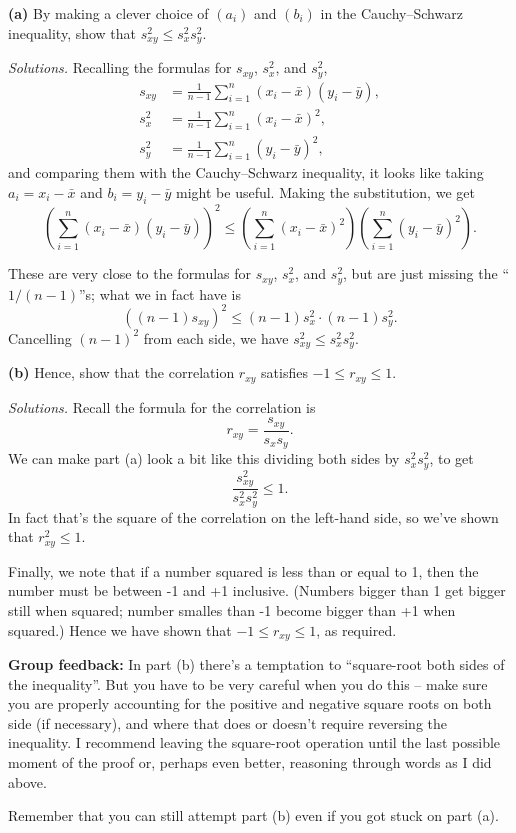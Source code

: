 \documentclass[
  a4paper,
]{book}
\theoremstyle{definition}
\theoremstyle{definition}
\theoremstyle{definition}
\theoremstyle{definition}
\theoremstyle{remark}
\begin{document}
\textbf{(a)} By making a clever choice of \((a_i)\) and \((b_i)\) in the Cauchy--Schwarz inequality, show that \(s_{xy}^2 \leq s_x^2 s_y^2\).

\begin{myanswers}
\emph{Solutions.}
Recalling the formulas for \(s_{xy}\), \(s_x^2\), and \(s_y^2\),
\begin{align*}
s_{xy} &= \frac{1}{n-1} \sum_{i=1}^n (x_i - \bar x)(y_i - \bar y) ,\\
s_{x}^2 &= \frac{1}{n-1} \sum_{i=1}^n (x_i - \bar x)^2 ,\\
s_{y}^2 &= \frac{1}{n-1} \sum_{i=1}^n (y_i - \bar y)^2 ,
\end{align*}
and comparing them with the Cauchy--Schwarz inequality, it looks like taking \(a_i = x_i - \bar x\) and \(b_i = y_i - \bar y\) might be useful. Making the substitution, we get
\[ \left( \sum_{i=1}^n (x_i - \bar x)(y_i - \bar y) \right)^2 \leq \left( \sum_{i=1}^n (x_i - \bar x)^2 \right) \left(\sum_{i=1}^n (y_i - \bar y)^2 \right) . \]

These are very close to the formulas for \(s_{xy}\), \(s_x^2\), and \(s_y^2\), but are just missing the ``\(1/(n-1)\)''s; what we in fact have is
\[ \left( (n-1) s_{xy} \right)^2 \leq (n-1)s_x^2 \cdot (n-1) s_y^2 .\]
Cancelling \((n-1)^2\) from each side, we have \(s_{xy}^2 \leq s_x^2 s_y^2\).

\end{myanswers}

\textbf{(b)}
Hence, show that the correlation \(r_{xy}\) satisfies \(-1 \leq r_{xy} \leq 1\).

\begin{myanswers}
\emph{Solutions.}
Recall the formula for the correlation is
\[ r_{xy} = \frac{s_{xy}}{s_xs_y} . \]
We can make part (a) look a bit like this dividing both sides by \(s_x^2 s_y^2\), to get
\[\frac{s_{xy}^2}{s_x^2 s_y^2} \leq 1.   \]
In fact that's the square of the correlation on the left-hand side, so we've shown that \(r_{xy}^2 \leq 1\).

Finally, we note that if a number squared is less than or equal to 1, then the number must be between -1 and +1 inclusive. (Numbers bigger than 1 get bigger still when squared; number smalles than -1 become bigger than +1 when squared.) Hence we have shown that \(-1 \leq r_{xy} \leq 1\), as required.

\textbf{Group feedback:} In part (b) there's a temptation to ``square-root both sides of the inequality''. But you have to be very careful when you do this -- make sure you are properly accounting for the positive and negative square roots on both side (if necessary), and where that does or doesn't require reversing the inequality. I recommend leaving the square-root operation until the last possible moment of the proof or, perhaps even better, reasoning through words as I did above.

Remember that you can still attempt part (b) even if you got stuck on part (a).

\end{myanswers}
\end{document}
